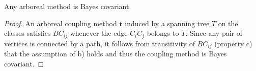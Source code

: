 \begin{prop}
Any arboreal method is Bayes covariant.
\end{prop}
\begin{proof}

An arboreal coupling method $\boldsymbol{t}$ induced by a spanning tree $T$ on the classes satisfies $BC_{ij}$ whenever the edge $C_iC_j$ belongs to $T$. Since any pair of vertices is connected by a path, it follows from transitivity of $BC_{ij}$ (property c) that the assumption of b) holds and thus the coupling method is Bayes covariant.
	
	
%	
%	
%	
%	

\end{proof}
